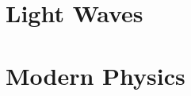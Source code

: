 \documentclass[
  12pt, %
  letterpaper,
]{LegrandOrangeBook}
\begin{document}



  

\part{Light Waves}










\part{Modern Physics}

%
%



\end{document}
